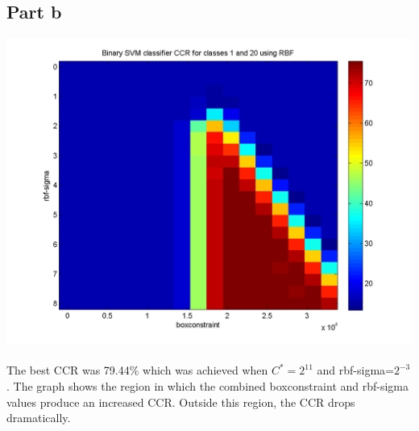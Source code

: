 \documentclass[paper=a4, fontsize=11pt]{scrartcl} %
\numberwithin{equation}{section} %
\numberwithin{figure}{section} %
\numberwithin{table}{section} %
\begin{document}
	\subsection{Part b}
	\includegraphics[scale=.8]{part_b_CV_CCR}
	\\\\
	The best CCR was 79.44\% which was achieved when $C^* = 2^{11}$ and rbf-sigma=$2^{-3}$. The graph shows the region in which the combined boxconstraint and rbf-sigma values produce an increased CCR. Outside this region, the CCR drops dramatically.

	\newpage		
\end{document}
